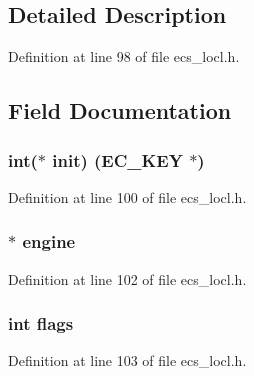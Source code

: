 \subsection{Detailed Description}


Definition at line 98 of file ecs\+\_\+locl.\+h.



\subsection{Field Documentation}
\subsubsection[{\texorpdfstring{init}{init}}]{\setlength{\rightskip}{0pt plus 5cm}int($\ast$ init) ({\bf E\+C\+\_\+\+K\+EY} $\ast$)}\hypertarget{structecdsa__data__st_abe4cc01385a304b13c23583b069cba3f}{}\label{structecdsa__data__st_abe4cc01385a304b13c23583b069cba3f}


Definition at line 100 of file ecs\+\_\+locl.\+h.

\subsubsection[{\texorpdfstring{engine}{engine}}]{$\ast$ engine}\hypertarget{structecdsa__data__st_a4eb35fa252ec72ad7c53a4c8d30a7fd3}{}\label{structecdsa__data__st_a4eb35fa252ec72ad7c53a4c8d30a7fd3}


Definition at line 102 of file ecs\+\_\+locl.\+h.

\subsubsection[{\texorpdfstring{flags}{flags}}]{\setlength{\rightskip}{0pt plus 5cm}int flags}\hypertarget{structecdsa__data__st_ac8bf36fe0577cba66bccda3a6f7e80a4}{}\label{structecdsa__data__st_ac8bf36fe0577cba66bccda3a6f7e80a4}


Definition at line 103 of file ecs\+\_\+locl.\+h.

